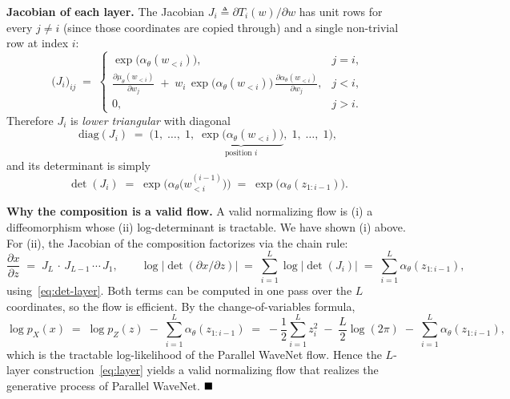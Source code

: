\documentclass{article}
\begin{document}
{    \textbf{Jacobian of each layer.} The Jacobian $J_i \triangleq \partial T_i(w) / \partial w$ has unit rows for every $j \neq i$ (since those coordinates are copied through) and a single non-trivial row at index $i$:
    \begin{equation*}
        \bigl(J_i\bigr)_{ij} \;=\; \begin{cases}
            \exp\bigl(\alpha_\theta(w_{<i})\bigr), & j = i, \\[2pt]
            \frac{\partial \mu_\theta(w_{<i})}{\partial w_j} \;+\; w_i\,\exp\bigl(\alpha_\theta(w_{<i})\bigr)\,\frac{\partial \alpha_\theta(w_{<i})}{\partial w_j}, & j < i, \\[2pt]
            0, & j > i.
        \end{cases}
    \end{equation*}
    Therefore $J_i$ is \emph{lower triangular} with diagonal
    \[
        \mathrm{diag}(J_i) \;=\; \bigl(1,\; \ldots,\; 1,\; \underbrace{\exp\bigl(\alpha_\theta(w_{<i})\bigr)}_{\text{position }i},\; 1,\; \ldots,\; 1\bigr),
    \]
    and its determinant is simply
    \begin{equation}
        \det(J_i) \;=\; \exp\bigl(\alpha_\theta\bigl(w^{(i-1)}_{<i}\bigr)\bigr) \;=\; \exp\bigl(\alpha_\theta(z_{1:i-1})\bigr).
        \label{eq:det-layer}
    \end{equation}

    \textbf{Why the composition is a valid flow.} A valid normalizing flow is (i) a diffeomorphism whose (ii) log-determinant is tractable. We have shown (i) above. For (ii), the Jacobian of the composition factorizes via the chain rule:
    \begin{equation*}
        \frac{\partial x}{\partial z} \;=\; J_L \,\cdot\, J_{L-1} \,\cdots\, J_1,
        \qquad
        \log\bigl|\det(\partial x / \partial z)\bigr| \;=\; \sum_{i=1}^{L} \log\bigl|\det(J_i)\bigr| \;=\; \sum_{i=1}^{L} \alpha_\theta(z_{1:i-1}),
    \end{equation*}
    using~\eqref{eq:det-layer}. Both terms can be computed in one pass over the $L$ coordinates, so the flow is efficient. By the change-of-variables formula,
    \begin{equation*}
        \log p_X(x) \;=\; \log p_Z(z) \;-\; \sum_{i=1}^{L} \alpha_\theta(z_{1:i-1})
        \;=\; -\frac{1}{2}\sum_{i=1}^{L} z_i^2 \;-\; \frac{L}{2}\log(2\pi) \;-\; \sum_{i=1}^{L} \alpha_\theta(z_{1:i-1}),
    \end{equation*}
    which is the tractable log-likelihood of the Parallel WaveNet flow. Hence the $L$-layer construction~\eqref{eq:layer} yields a valid normalizing flow that realizes the generative process of Parallel WaveNet. $\hfill\blacksquare$
}
\end{document}
